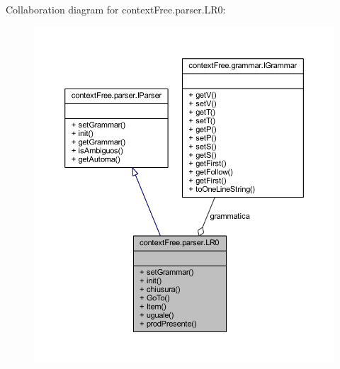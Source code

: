 Collaboration diagram for context\-Free.\-parser.\-L\-R0\-:
\nopagebreak
\begin{figure}[H]
\begin{center}
\leavevmode
\includegraphics[width=350pt]{classcontext_free_1_1parser_1_1_l_r0__coll__graph}
\end{center}
\end{figure}
